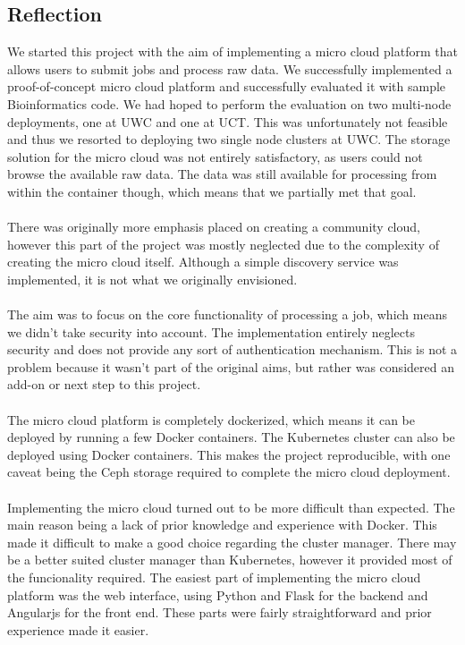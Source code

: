 \documentclass{sig-alternate-05-2015}
\begin{document}
\subsection{Reflection}
We started this project with the aim of implementing a micro cloud platform that allows users to submit jobs and process raw data. We successfully implemented a proof-of-concept micro cloud platform and successfully evaluated it with sample Bioinformatics code. We had hoped to perform the evaluation on two multi-node deployments, one at UWC and one at UCT. This was unfortunately not feasible and thus we resorted to deploying two single node clusters at UWC. The storage solution for the micro cloud was not entirely satisfactory, as users could not browse the available raw data. The data was still available for processing from within the container though, which means that we partially met that goal.
\\\\
There was originally more emphasis placed on creating a community cloud, however this part of the project was mostly neglected due to the complexity of creating the micro cloud itself. Although a simple discovery service was implemented, it is not what we originally envisioned. 
\\\\
The aim was to focus on the core functionality of processing a job, which means we didn't take security into account. The implementation entirely neglects security and does not provide any sort of authentication mechanism. This is not a problem because it wasn't part of the original aims, but rather was considered an add-on or next step to this project.
\\\\
The micro cloud platform is completely dockerized, which means it can be deployed by running a few Docker containers. The Kubernetes cluster can also be deployed using Docker containers. This makes the project reproducible, with one caveat being the Ceph storage required to complete the micro cloud deployment. 
\\\\
Implementing the micro cloud turned out to be more difficult than expected. The main reason being a lack of prior knowledge and experience with Docker. This made it difficult to make a good choice regarding the cluster manager. There may be a better suited cluster manager than Kubernetes, however it provided most of the funcionality required. The easiest part of implementing the micro cloud platform was the web interface, using Python and Flask for the backend and Angularjs for the front end. These parts were fairly straightforward and prior experience made it easier. 
\end{document}
